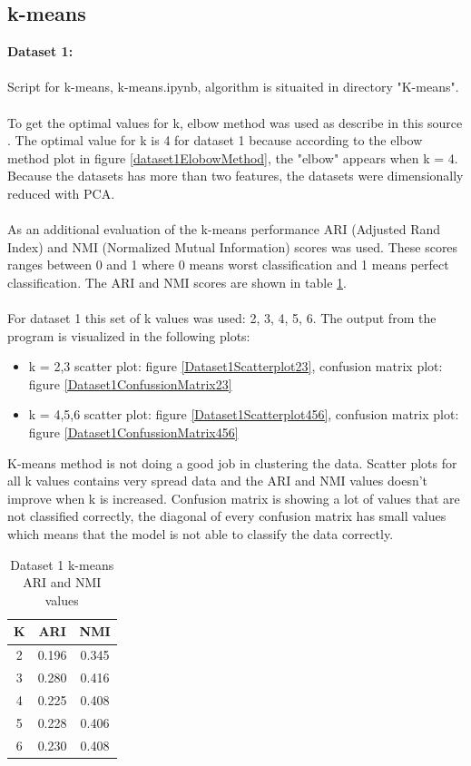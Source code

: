 \documentclass[12pt]{report}
\begin{document}
	\subsection*{k-means}
	\textbf{Dataset 1:}\\
	\\
	Script for k-means, k-means.ipynb, algorithm is situaited in directory "K-means".\\
	\\
	To get the optimal values for k, elbow method was used as describe in this source \cite{k-means}. The optimal value for k is 4 for dataset 1 because according to the elbow method plot in figure \ref{dataset1ElobowMethod}, the "elbow" appears when k = 4. Because the datasets has more than two features, the datasets were dimensionally reduced with PCA. \\
	\\
	As an additional evaluation of the k-means performance ARI (Adjusted Rand Index) and NMI (Normalized Mutual Information) scores was used. These scores ranges between 0 and 1 where 0 means worst classification and 1 means perfect classification. The ARI and NMI scores are shown in table \ref{dataset1k-meansARINMI}.\\
	\\
	For dataset 1 this set of k values was used: 2, 3, 4, 5, 6. The output from the program is visualized in the following plots:
	\begin{itemize}
		\item k = 2,3 scatter plot: figure \ref{Dataset1Scatterplot23}, confusion matrix plot: figure \ref{Dataset1ConfussionMatrix23} 
		\item k = 4,5,6 scatter plot: figure \ref{Dataset1Scatterplot456}, confusion matrix plot: figure \ref{Dataset1ConfussionMatrix456}
	\end{itemize}
	K-means method is not doing a good job in clustering the data. Scatter plots for all k values contains very spread data and the ARI and NMI values doesn't improve when k is increased. Confusion matrix is showing a lot of values that are not classified correctly, the diagonal of every confusion matrix has small values which means that the model is not able to classify the data correctly.
	\begin{table}[H]
		\centering
		\begin{tabular}{|c|c|c|}
			\hline
			K & ARI & NMI \\
			\hline
			2 & 0.196 & 0.345 \\
			\hline
			3 & 0.280 & 0.416 \\
			\hline
			4 & 0.225 & 0.408 \\
			\hline
			5 & 0.228 & 0.406 \\
			\hline
			6 & 0.230 & 0.408 \\
			\hline
		\end{tabular}
		\caption{Dataset 1 k-means ARI and NMI values}
		\label{dataset1k-meansARINMI}
	\end{table}
\end{document}
